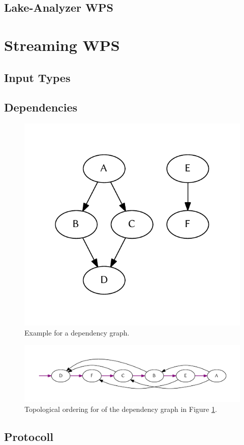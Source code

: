 	\subsection{Lake-Analyzer WPS}
\section{Streaming WPS}
	\subsection{Input Types}
	\subsection{Dependencies}
	\begin{figure}[!htb]
		\centering
		\includegraphics[width=.4474\textwidth]{figures/unordered-graph.pdf} %
		\caption{\label{fig:graph:unordered} Example for a dependency graph.}
	\end{figure}
	\begin{figure}[!htb]
		\centering
		\includegraphics[width=1\textwidth]{figures/ordered-graph.pdf} %
		\caption{\label{fig:graph:ordered} Topological ordering for of the dependency graph in Figure \ref{fig:graph:unordered}.}
	\end{figure}

	\subsection{Protocoll}
